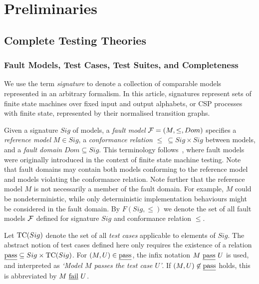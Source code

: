 \section{Preliminaries}
\subsection{Complete Testing Theories}

\subsubsection*{Fault Models, Test Cases, Test Suites, and Completeness}
\label{sec:fsmfm}

We use the term \emph{signature} to denote a collection of comparable models represented 
in an arbitrary formalism. In this article, signatures represent sets of 
finite state machines
over fixed input and output alphabets, or CSP processes with finite state, represented 
by their normalised transition graphs.



Given a signature $Sig$  of models, a  \emph{fault model} ${\cal F} = (M,\le,Dom)$
specifies a \emph{reference model} $M\in Sig$, a \emph{conformance relation} 
$\le\ \subseteq Sig\times Sig$ between models, and a \emph{fault domain}
$Dom\subseteq Sig$. This terminology follows~\cite{gotzhein_fault_1996}, where
fault models were originally introduced in the context of finite state machine testing.
Note that fault domains may contain both models conforming to the reference model and
models violating the conformance relation. Note further that the reference model $M$ 
is not necessarily a member of the fault domain. For example, $M$ could be nondeterministic, while only deterministic implementation behaviours might be  considered in the fault domain.
By $F(Sig,\le)$ we denote the set of all fault models ${\cal F}$ 
defined for 
signature $Sig$ and conformance relation $\le$.

Let ${\text{TC}}(Sig)$ denote the set of all \emph{test cases} applicable to
elements of $Sig$. The abstract notion of test cases defined here only requires the existence of  
 a  relation $\underline{\text{pass}}\subseteq Sig\times {\text{TC}}(Sig)$. 
For
$(M,U)\in\underline{\text{pass}}$, the infix notation $M\ \underline{\text{pass}}\ U$ is used, and   interpreted as 
{\it `Model $M$ passes the test case $U$'}. 
If $(M,U)\not\in\underline{\text{pass}}$ holds, this is abbreviated by $M\ \underline{\text{fail}}\ U$.




